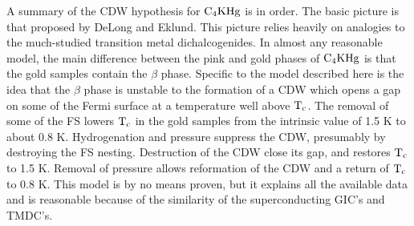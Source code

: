         A summary of the CDW hypothesis for $\rm C_4KHg$  is in order.  The
basic  picture is that  proposed by DeLong and Eklund.\cite{delong83}  This
picture relies heavily on analogies to the much-studied transition metal
dichalcogenides.   In  almost any reasonable   model,  the main  difference
between the pink and gold phases of $\rm  C_4KHg$ is that  the gold samples
contain the $\beta$ phase. Specific to the model described here is the idea
that the $\beta$ phase is unstable to the formation of a  CDW which opens a
gap on  some of the  Fermi surface at  a temperature well above  $\rm T_c$.
The removal of some of the FS lowers $\rm T_c$ in the gold samples from the
intrinsic  value  of 1.5  K  to about  0.8  K.   Hydrogenation and pressure
suppress the CDW, presumably by destroying  the FS nesting.  Destruction of
the CDW  close   its gap,  and restores $\rm  T_c$  to 1.5  K.   Removal of
pressure allows reformation of the CDW and a return  of $\rm T_c$ to 0.8 K.
This model is  by no means proven, but  it explains  all the available data
and is  reasonable because  of the similarity of  the superconducting GIC's
and TMDC's.

